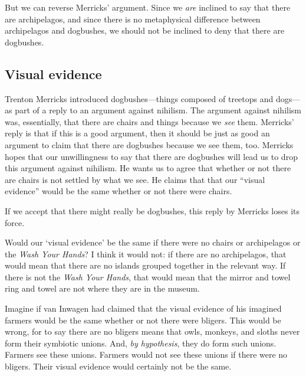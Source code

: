 \documentclass[11pt]{article}
\begin{document}
\begin{spacing}{1.25}
But we can reverse Merricks' argument.  Since we {\em are} inclined to
say that there are archipelagos, and since there is no metaphysical
difference between archipelagos and dogbushes, we should not be
inclined to deny that there are dogbushes.


\subsection{Visual evidence}
\label{visual}
Trenton Merricks introduced dogbushes---things composed of treetops
and dogs---as part of a reply to an argument against nihilism.  The
argument against nihilism was, essentially, that there are chairs and
things because we {\em see} them.  Merricks' reply is that if this is
a good argument, then it should be just as good an argument to claim
that there are dogbushes because we see them, too.  Merricks hopes
that our unwillingness to say that there are dogbushes will lead us
to drop this argument against nihilism.  He wants us to agree that
whether or not there are chairs is not settled by what we see.  He
claims that  that our ``visual evidence'' would be the same whether
or not there were chairs.

If we accept that there might really be dogbushes, this reply by
Merricks loses its force.

Would our `visual evidence' be the same if there were no chairs or
archipelagos or the {\em Wash Your Hands}?  I think it would not: if
there are no archipelagos, that would mean that there are no islands
grouped together in the relevant way.  If there is not the {\em Wash
  Your Hands}, that would mean that the mirror and towel ring and
towel are not where they are in the museum.

Imagine if van Inwagen had claimed that the visual evidence of his
imagined farmers would be the same whether or not there were bligers.
This would be wrong, for to say there are no bligers means that owls,
monkeys, and sloths never form their symbiotic unions.  And, {\em by
  hypothesis}, they do form such unions.  Farmers see these unions.
Farmers would not see these unions if there were no bligers.  Their
visual evidence would certainly not be the same.


\end{spacing}
\end{document}
